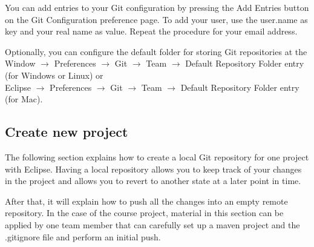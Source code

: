 \documentclass{article}
\begin{document}
You can add entries to your Git configuration by pressing the Add
Entries button on the Git Configuration preference page. To add your
user, use the user.name as key and your real name as value. Repeat the
procedure for your email address. 

Optionally, you can configure the default folder for storing Git
repositories at the\\ 
Window $\rightarrow$ Preferences $\rightarrow$ Git $\rightarrow$ Team
$\rightarrow$ Default Repository Folder entry (for Windows or Linux) or\\
Eclipse $\rightarrow$ Preferences $\rightarrow$ Git $\rightarrow$ Team
$\rightarrow$ Default  Repository Folder entry (for Mac). 



\subsection{Create new project}

The following section explains how to create a local Git repository
for one project with Eclipse. Having a local repository allows you to keep track of your
changes in the project and allows you to revert to another state at a
later point in time.
 
After that, it will explain how to push all the changes into an empty
remote repository. In the case of the course project, material in this
section can be applied by one team member that can carefully set up a
maven project and the .gitignore file and perform an initial push.
\end{document}
